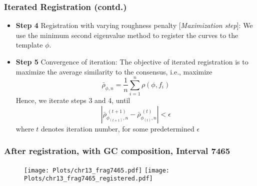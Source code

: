 \documentclass[10pt,dvipsnames,table]{beamer}
\begin{document}
\begin{frame}
\frametitle{Iterated Registration (contd.)}
\begin{itemize}
\item {\bf{Step 4}} Registration with varying roughness penalty [{\emph{Maximization step}}]: We use the minimum second eigenvalue method to register the curves to the template $\phi$. 
\item {\bf{Step 5}} Convergence of iteration: The objective of iterated registration is to maximize the average similarity to the consensus, i.e., maximize 
\[ \bar{\rho}_{\phi, n} = \frac{1}{n} \sum \limits_{i = 1}^{n} \rho(\phi, f_i)\]
Hence, we iterate steps 3 and 4, until
\[ |\bar{\rho}_{\phi_{(t+1)}, n}^{\ (t+1)} - \bar{\rho}_{\phi_{(t)}, n}^{ \ (t)} | < \epsilon \]
where $t$ denotes iteration number, for some predetermined $\epsilon$
\end{itemize}
\end{frame}


\begin{frame}
\frametitle{After registration, with GC composition, Interval 7465}
\begin{figure}[t]
\texttt{[image: Plots/chr13\_frag7465.pdf]}
\texttt{[image: Plots/chr13\_frag7465\_registered.pdf]}
\end{figure}
\end{frame}
\end{document}

